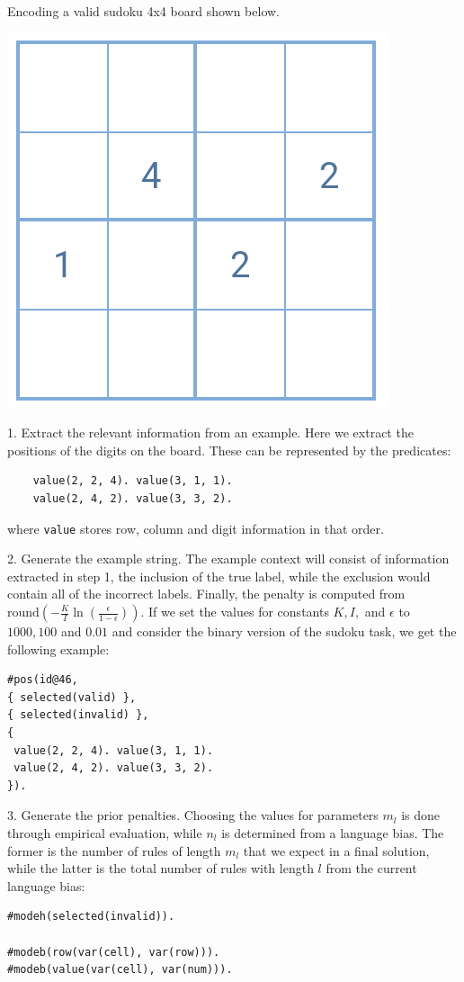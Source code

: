 \begin{example}
\label{sudoku4x4-examples-prior}
Encoding a valid sudoku 4x4 board shown below.

\begin{center}
\setlength\parskip{0pt}
\includegraphics[width=.2\linewidth]{logic-based-classification/example_sudoku_board.png}
\end{center}

1. Extract the relevant information from an example. Here we extract the positions of the digits on the board.
These can be represented by the predicates:
\begin{verbatim}
    value(2, 2, 4). value(3, 1, 1). 
    value(2, 4, 2). value(3, 3, 2).
\end{verbatim}
where \verb_value_ stores row, column and digit information in that order.

2. Generate the example string. 
The example context will consist of information extracted in step 1, the inclusion of the true label, while the exclusion would contain all of the incorrect labels.
Finally, the penalty is computed from $\text{round} \left ( -\frac{K}{I} \ln \left ( \frac{\epsilon}{1 - \epsilon} \right ) \right )$.
If we set the values for constants $K, I,$ and $\epsilon$ to $1000, 100$ and $0.01$ and consider the binary version of the sudoku task, we get the following example:

\begin{verbatim}
#pos(id@46,
{ selected(valid) },
{ selected(invalid) },
{
 value(2, 2, 4). value(3, 1, 1). 
 value(2, 4, 2). value(3, 3, 2).
}).
\end{verbatim}

3. Generate the prior penalties.
Choosing the values for parameters $m_l$ is done through empirical evaluation, while $n_l$ is determined from a language bias.
The former is the number of rules of length $m_l$ that we expect in a final solution, while the latter is the total number of rules with length $l$ from the current language bias:

\begin{verbatim}
#modeh(selected(invalid)).

#modeb(row(var(cell), var(row))).
#modeb(value(var(cell), var(num))).


\end{verbatim}
\end{example}
